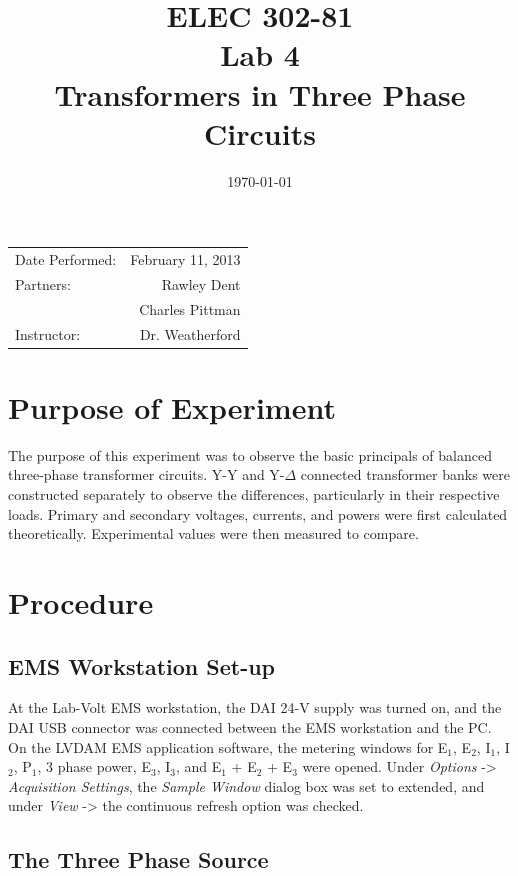 \documentclass{article}
\title{ELEC 302-81\\ Lab 4\\ Transformers in Three Phase Circuits}
\date{\today}
\begin{document}
\maketitle

\begin{center}
  \begin{tabular}{lr}
    Date Performed: & February 11, 2013 \\
    Partners: & Rawley Dent \\
              & Charles Pittman \\
    Instructor: & Dr. Weatherford
  \end{tabular}
\end{center}

\pagebreak

\setlength\parindent{0pt}

\section{Purpose of Experiment}

The purpose of this experiment was to observe the basic principals of balanced
three-phase transformer circuits. Y-Y and Y-$\Delta$ connected transformer
banks were constructed separately to observe the differences, particularly in
their respective loads. Primary and secondary voltages, currents, and powers
were first calculated theoretically. Experimental values were then measured to
compare.

\section{Procedure}

\subsection{EMS Workstation Set-up}

At the Lab-Volt EMS workstation, the DAI 24-V supply was turned on, and the DAI
USB connector was connected between the EMS workstation and the {PC}. On the
LVDAM EMS application software, the metering windows for E$_1$, E$_2$, I$_1$,
I$_2$, P$_1$, 3 phase power, E$_3$, I$_3$, and E$_1$ + E$_2$ + E$_3$ were
opened.  Under \emph{Options} -> \emph{Acquisition Settings}, the \emph{Sample
Window} dialog box was set to extended, and under \emph{View} -> the continuous
refresh option was checked.

\subsection{The Three Phase Source}
\end{document}
